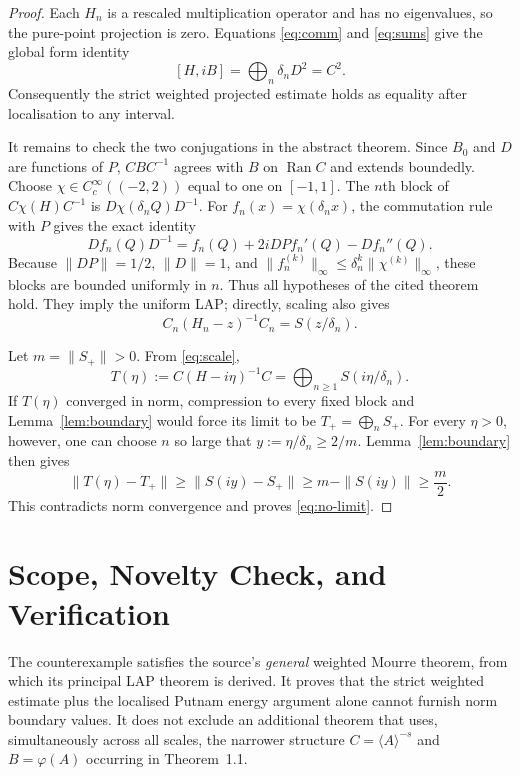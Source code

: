 \documentclass[11pt]{article}
\newcommand{\Ran}{\operatorname{Ran}}
\begin{document}
\begin{proof}
Each $H_n$ is a rescaled multiplication operator and has no eigenvalues, so
the pure-point projection is zero.  Equations \eqref{eq:comm} and
\eqref{eq:sums} give the global form identity
\[
 [H,iB]=\bigoplus_n\delta_nD^2=C^2.
 \tag{10}\label{eq:strict}
\]
Consequently the strict weighted projected estimate holds as equality after
localisation to any interval.

It remains to check the two conjugations in the abstract theorem.  Since
$B_0$ and $D$ are functions of $P$, $CBC^{-1}$ agrees with $B$ on
$\Ran C$ and extends boundedly.  Choose
$\chi\in C_c^\infty((-2,2))$ equal to one on $[-1,1]$.  The $n$th block of
$C\chi(H)C^{-1}$ is $D\chi(\delta_nQ)D^{-1}$.  For
$f_n(x)=\chi(\delta_nx)$, the commutation rule with $P$ gives the exact
identity
\[
 Df_n(Q)D^{-1}
 =f_n(Q)+2iDPf_n'(Q)-Df_n''(Q).
 \tag{11}\label{eq:cutoff}
\]
Because $\|DP\|=1/2$, $\|D\|=1$, and
$\|f_n^{(k)}\|_\infty\leq\delta_n^k\|\chi^{(k)}\|_\infty$, these blocks
are bounded uniformly in $n$.  Thus all hypotheses of the cited theorem
hold.  They imply the uniform LAP; directly, scaling also gives
\[
 C_n(H_n-z)^{-1}C_n=S(z/\delta_n).
 \tag{12}\label{eq:scale}
\]

Let $m=\|S_+\|>0$.  From \eqref{eq:scale},
\[
 T(\eta):=C(H-i\eta)^{-1}C
   =\bigoplus_{n\geq1}S(i\eta/\delta_n).
 \tag{13}\label{eq:T}
\]
If $T(\eta)$ converged in norm, compression to every fixed block and
Lemma~\ref{lem:boundary} would force its limit to be
$T_+=\bigoplus_nS_+$.  For every $\eta>0$, however, one can choose $n$ so
large that $y:=\eta/\delta_n\geq2/m$.  Lemma~\ref{lem:boundary} then gives
\[
 \|T(\eta)-T_+\|
 \geq\|S(iy)-S_+\|
 \geq m-\|S(iy)\|
 \geq\frac m2.
\]
This contradicts norm convergence and proves \eqref{eq:no-limit}.
\end{proof}

\section*{Scope, Novelty Check, and Verification}

The counterexample satisfies the source's \emph{general} weighted Mourre
theorem, from which its principal LAP theorem is derived.  It proves that
the strict weighted estimate plus the localised Putnam energy argument alone
cannot furnish norm boundary values.  It does not exclude an additional
theorem that uses, simultaneously across all scales, the narrower structure
$C=\langle A\rangle^{-s}$ and $B=\varphi(A)$ occurring in Theorem~1.1.
\end{document}
